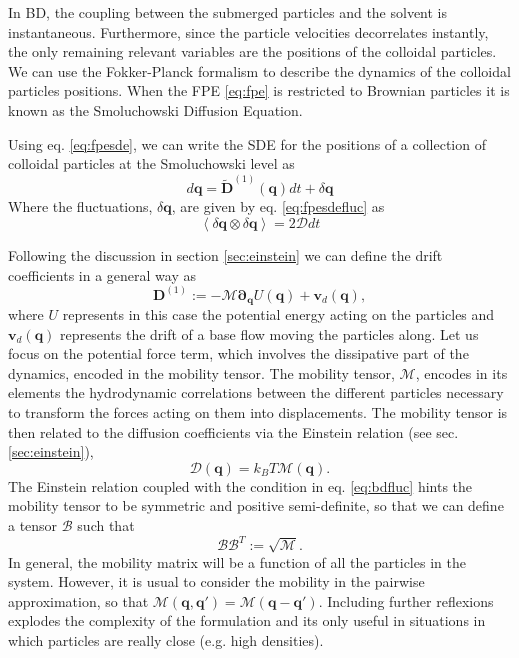 \documentclass[ twoside,openright,titlepage,numbers=noenddot,%
headinclude,footinclude,cleardoublepage=empty,abstract=on,
BCOR=5mm,paper=a4,fontsize=11pt, dvipsnames
]{scrreprt}
\renewcommand{\vec}[1]{\bm{#1}}
\newcommand{\tens}[1]{\bm{\mathcal{#1}}}
\newcommand{\kT}{k_B T}
\newcommand{\ppos}{q}
\begin{document}
In \gls{BD}, the coupling between the submerged particles and the solvent is instantaneous.
Furthermore, since the particle velocities decorrelates instantly, the only remaining relevant variables are the positions of the colloidal particles. We can use the Fokker-Planck formalism to describe the dynamics of the colloidal particles positions. When the \gls{FPE} \eqref{eq:fpe} is restricted to Brownian particles it is known as the Smoluchowski Diffusion Equation.

Using eq. \eqref{eq:fpesde}, we can write the \gls{SDE} for the positions of a collection of colloidal particles at the Smoluchowski level as
\begin{equation}
  \label{eq:bdlange}
  d\vec{\ppos} = \widetilde{\vec{D}}^{(1)}(\vec{\ppos})dt + \delta\vec{\ppos}
\end{equation}
Where the fluctuations, $\delta\vec{\ppos}$, are given by eq. \eqref{eq:fpesdefluc} as
\begin{equation}
  \label{eq:bdfluc}
  \left\langle \delta\vec{\ppos}\otimes \delta\vec{\ppos}\right\rangle = 2\tens{D} dt
\end{equation}

Following the discussion in section \ref{sec:einstein} we can define the drift coefficients in a general way as
\begin{equation}
  \label{eq:bddrift}
\vec{D}^{(1)} := -\tens{M}\vec{\partial}_{\vec{\ppos}}U(\vec{\ppos}) + \vec{v}_d(\vec{\ppos}),
\end{equation}
where $U$ represents in this case the potential energy acting on the particles and $\vec{v}_d(\vec{\ppos})$ represents the drift of a base flow moving the particles along. Let us focus on the potential force term, which involves the dissipative part of  the dynamics, encoded in the mobility tensor. The mobility tensor, $\tens{M}$, encodes in its elements the hydrodynamic correlations between the different particles necessary to transform the forces acting on them into displacements.
The mobility tensor is then related to the diffusion coefficients via the Einstein relation (see sec. \ref{sec:einstein}),
\begin{equation}
  \label{eq:bdeinstein}
  \tens{D}(\vec{\ppos}) = \kT \tens{M}(\vec{\ppos}).
\end{equation}
The Einstein relation coupled with the condition in eq. \eqref{eq:bdfluc} hints the mobility tensor to be symmetric and positive semi-definite, so that we can define a tensor $\tens{B}$ such that
\begin{equation}
  \tens{B}\tens{B}^T := \sqrt{\tens{M}}.
\end{equation}
In general, the mobility matrix will be a function of all the particles in the system. However, it is usual to consider the mobility in the pairwise approximation, so that $\tens{M}(\vec{\ppos}, \vec{\ppos}') = \tens{M}(\vec{\ppos}-\vec{\ppos}')$. Including further reflexions explodes the complexity of the formulation and its only useful in situations in which particles are really close (e.g. high densities)\cite{Dhont1996}.
\end{document}
